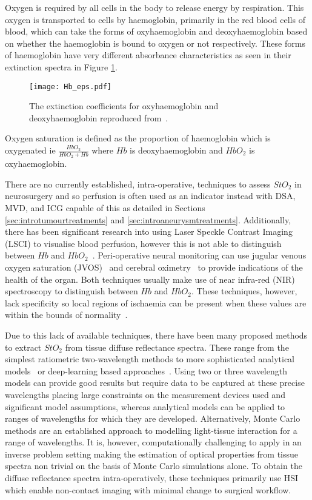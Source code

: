 Oxygen is required by all cells in the body to release energy by respiration. This oxygen is transported to cells by haemoglobin, primarily in the red blood cells of blood, which can take the forms of oxyhaemoglobin and deoxyhaemoglobin based on whether the haemoglobin is bound to oxygen or not respectively. These forms of haemoglobin have very different absorbance characteristics as seen in their extinction spectra in Figure \ref{fig:Haemoglobinext}. 
\begin{figure}[h]
    \centering 
    \texttt{[image: Hb\_eps.pdf]}
    \caption{The extinction coefficients for oxyhaemoglobin and deoxyhaemoglobin reproduced from~\cite{Prahl1998}.}
    \label{fig:Haemoglobinext}
\end{figure}
Oxygen saturation is defined as the proportion of haemoglobin which is oxygenated ie $\frac{HbO_2}{HbO_2 + Hb}$ where $Hb$ is deoxyhaemoglobin and $HbO_2$ is oxyhaemoglobin. 

There are no currently established, intra-operative, techniques to assess $StO_2$ in neurosurgery and so perfusion is often used as an indicator instead with DSA, MVD, and ICG capable of this as detailed in Sections \ref{sec:introtumourtreatments} and \ref{sec:introaneurysmtreatments}. Additionally, there has been significant research into using Laser Speckle Contrast Imaging (LSCI) to visualise blood perfusion, however this is not able to distinguish between $Hb$ and $HbO_2$~\cite{Dunn2012, Zhong2021}. Peri-operative neural monitoring can use jugular venous oxygen saturation (JVOS)~\cite{Raith2020} and cerebral oximetry~\cite{Lian2020} to provide indications of the health of the organ. Both techniques usually make use of near infra-red (NIR) spectroscopy to distinguish between $Hb$ and $HbO_2$. These techniques, however, lack specificity so local regions of ischaemia can be present when these values are within the bounds of normality~\cite{Raith2020, Zhong2021}.

Due to this lack of available techniques, there have been many proposed methods to extract $StO_2$ from tissue diffuse reflectance spectra. These range from the simplest ratiometric two-wavelength methods to more sophisticated analytical models~\cite{MacKenzie2018} or deep-learning based approaches~\cite{Ayala2023}. Using two or three wavelength models can provide good results but require data to be captured at these precise wavelengths placing large constraints on the measurement devices used and significant model assumptions, whereas analytical models can be applied to ranges of wavelengths for which they are developed. Alternatively, Monte Carlo methods are an established approach to modelling light-tissue interaction for a range of wavelengths. It is, however, computationally challenging to apply in an inverse problem setting making the estimation of optical properties from tissue spectra non trivial on the basis of Monte Carlo simulations alone. To obtain the diffuse reflectance spectra intra-operatively, these techniques primarily use HSI which enable non-contact imaging with minimal change to surgical workflow. 

